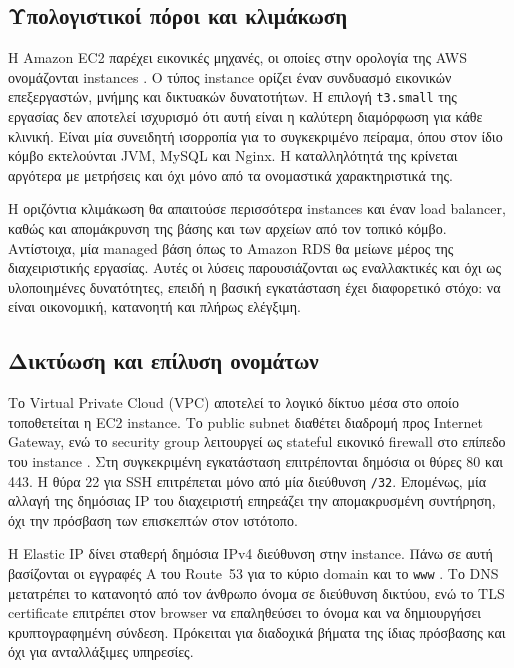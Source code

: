 \subsection{Υπολογιστικοί πόροι και κλιμάκωση}

Η Amazon EC2 παρέχει εικονικές μηχανές, οι οποίες στην ορολογία της AWS
ονομάζονται instances \cite{aws2026ec2}. Ο τύπος instance ορίζει έναν συνδυασμό εικονικών
επεξεργαστών, μνήμης και δικτυακών δυνατοτήτων. Η επιλογή
\texttt{t3.small} της εργασίας δεν αποτελεί ισχυρισμό ότι αυτή είναι η
καλύτερη διαμόρφωση για κάθε κλινική. Είναι μία συνειδητή ισορροπία για το
συγκεκριμένο πείραμα, όπου στον ίδιο κόμβο εκτελούνται JVM, MySQL και Nginx.
Η καταλληλότητά της κρίνεται αργότερα με μετρήσεις και όχι μόνο από τα
ονομαστικά χαρακτηριστικά της.

Η οριζόντια κλιμάκωση θα απαιτούσε περισσότερα instances και έναν load
balancer, καθώς και απομάκρυνση της βάσης και των αρχείων από τον τοπικό
κόμβο. Αντίστοιχα, μία managed βάση όπως το Amazon RDS θα μείωνε μέρος της
διαχειριστικής εργασίας. Αυτές οι λύσεις παρουσιάζονται ως εναλλακτικές και
όχι ως υλοποιημένες δυνατότητες, επειδή η βασική εγκατάσταση έχει διαφορετικό
στόχο: να είναι οικονομική, κατανοητή και πλήρως ελέγξιμη.

\subsection{Δικτύωση και επίλυση ονομάτων}

Το Virtual Private Cloud (VPC) αποτελεί το λογικό δίκτυο μέσα στο οποίο
τοποθετείται η EC2 instance. Το public subnet διαθέτει διαδρομή προς Internet
Gateway, ενώ το security group λειτουργεί ως stateful εικονικό firewall στο
επίπεδο του instance \cite{aws2026vpc,aws2026securitygroups}. Στη συγκεκριμένη εγκατάσταση επιτρέπονται δημόσια οι
θύρες 80 και 443. Η θύρα 22 για SSH επιτρέπεται μόνο από μία διεύθυνση
\texttt{/32}. Επομένως, μία αλλαγή της δημόσιας IP του διαχειριστή επηρεάζει
την απομακρυσμένη συντήρηση, όχι την πρόσβαση των επισκεπτών στον ιστότοπο.

Η Elastic IP δίνει σταθερή δημόσια IPv4 διεύθυνση στην instance. Πάνω σε
αυτή βασίζονται οι εγγραφές A του Route~53 για το κύριο domain και το
\texttt{www} \cite{aws2026route53}. Το DNS μετατρέπει το κατανοητό από τον άνθρωπο όνομα σε
διεύθυνση δικτύου, ενώ το TLS certificate επιτρέπει στον browser να
επαληθεύσει το όνομα και να δημιουργήσει κρυπτογραφημένη σύνδεση. Πρόκειται
για διαδοχικά βήματα της ίδιας πρόσβασης και όχι για ανταλλάξιμες υπηρεσίες.

